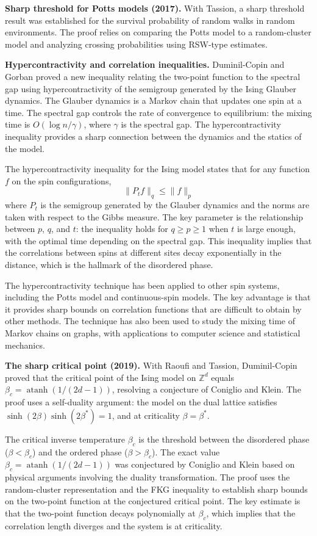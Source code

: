 \textbf{Sharp threshold for Potts models (2017).} With Tassion, a sharp threshold result was established for the survival probability of random walks in random environments. The proof relies on comparing the Potts model to a random-cluster model and analyzing crossing probabilities using RSW-type estimates.

\textbf{Hypercontractivity and correlation inequalities.} Duminil-Copin and Gorban proved a new inequality relating the two-point function to the spectral gap using hypercontractivity of the semigroup generated by the Ising Glauber dynamics. The Glauber dynamics is a Markov chain that updates one spin at a time. The spectral gap controls the rate of convergence to equilibrium: the mixing time is $O(\log n / \gamma)$, where $\gamma$ is the spectral gap. The hypercontractivity inequality provides a sharp connection between the dynamics and the statics of the model.

The hypercontractivity inequality for the Ising model states that for any function $f$ on the spin configurations,
\[
\|P_t f\|_{q} \le \|f\|_{p}
\]
where $P_t$ is the semigroup generated by the Glauber dynamics and the norms are taken with respect to the Gibbs measure. The key parameter is the relationship between $p$, $q$, and $t$: the inequality holds for $q \ge p \ge 1$ when $t$ is large enough, with the optimal time depending on the spectral gap. This inequality implies that the correlations between spins at different sites decay exponentially in the distance, which is the hallmark of the disordered phase.

The hypercontractivity technique has been applied to other spin systems, including the Potts model and continuous-spin models. The key advantage is that it provides sharp bounds on correlation functions that are difficult to obtain by other methods. The technique has also been used to study the mixing time of Markov chains on graphs, with applications to computer science and statistical mechanics.

\textbf{The sharp critical point (2019).} With Raoufi and Tassion, Duminil-Copin proved that the critical point of the Ising model on $\mathbb{Z}^d$ equals $\beta_c = \operatorname{atanh}(1/(2d-1))$, resolving a conjecture of Coniglio and Klein. The proof uses a self-duality argument: the model on the dual lattice satisfies $\sinh(2\beta) \sinh(2\beta^*) = 1$, and at criticality $\beta = \beta^*$.

The critical inverse temperature $\beta_c$ is the threshold between the disordered phase ($\beta < \beta_c$) and the ordered phase ($\beta > \beta_c$). The exact value $\beta_c = \operatorname{atanh}(1/(2d-1))$ was conjectured by Coniglio and Klein based on physical arguments involving the duality transformation. The proof uses the random-cluster representation and the FKG inequality to establish sharp bounds on the two-point function at the conjectured critical point. The key estimate is that the two-point function decays polynomially at $\beta_c$, which implies that the correlation length diverges and the system is at criticality.

